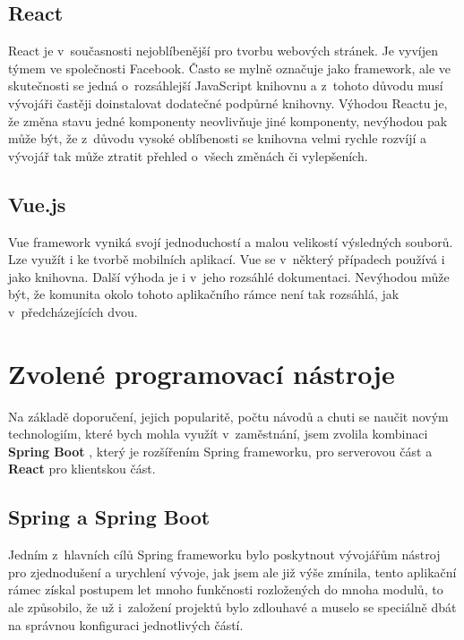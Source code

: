\subsection{React}
\label{reactFirst}

React je v~současnosti nejoblíbenější  pro tvorbu webových stránek. Je vyvíjen týmem ve společnosti Facebook. Často se mylně označuje jako framework, ale ve skutečnosti se jedná o~rozsáhlejší JavaScript knihovnu a z~tohoto důvodu musí vývojáři častěji doinstalovat dodatečné podpůrné knihovny. Výhodou Reactu je, že změna stavu jedné komponenty neovlivňuje jiné komponenty, nevýhodou pak může být, že z~důvodu vysoké oblíbenosti se knihovna velmi rychle rozvíjí a vývojář tak může ztratit přehled o~všech změnách či vylepšeních.

\subsection{Vue.js}

Vue framework vyniká svojí jednoduchostí a malou velikostí výsledných souborů. Lze využít i ke tvorbě mobilních aplikací. Vue se v~některý případech používá i jako knihovna. Další výhoda je i v~jeho rozsáhlé dokumentaci. Nevýhodou může být, že komunita okolo tohoto aplikačního rámce není tak rozsáhlá, jak v~předcházejících dvou.


\section{Zvolené programovací nástroje}

Na základě doporučení, jejich popularitě, počtu návodů a chuti se naučit novým technologiím, které bych mohla využít v~zaměstnání, jsem zvolila kombinaci \textbf{Spring Boot} \cite{Spring}, který je rozšířením Spring frameworku, pro serverovou část a \textbf{React} \cite{React} pro klientskou část.

\subsection{Spring a Spring Boot}

Jedním z~hlavních cílů Spring frameworku bylo poskytnout vývojářům nástroj pro zjednodušení a urychlení vývoje, jak jsem ale již výše zmínila, tento aplikační rámec získal postupem let mnoho funkčnosti rozložených do mnoha modulů, to ale způsobilo, že už i~založení projektů bylo zdlouhavé a muselo se speciálně dbát na správnou konfiguraci jednotlivých částí.

